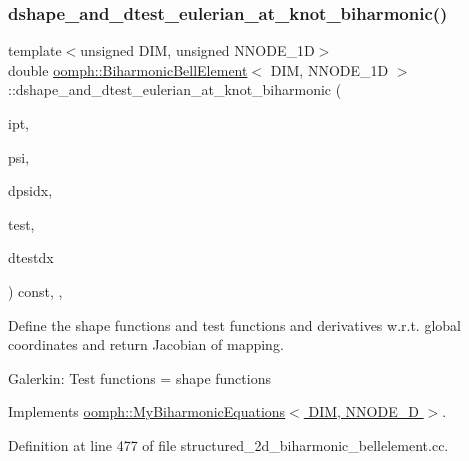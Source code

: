 \subsubsection{\texorpdfstring{dshape\+\_\+and\+\_\+dtest\+\_\+eulerian\+\_\+at\+\_\+knot\+\_\+biharmonic()}{dshape\_and\_dtest\_eulerian\_at\_knot\_biharmonic()}}
{\footnotesize\ttfamily template$<$unsigned D\+IM, unsigned N\+N\+O\+D\+E\+\_\+1D$>$ \\
double \hyperlink{classoomph_1_1BiharmonicBellElement}{oomph\+::\+Biharmonic\+Bell\+Element}$<$ D\+IM, N\+N\+O\+D\+E\+\_\+1D $>$\+::dshape\+\_\+and\+\_\+dtest\+\_\+eulerian\+\_\+at\+\_\+knot\+\_\+biharmonic (\begin{DoxyParamCaption}\item[{const unsigned \&}]{ipt,  }\item[{Shape \&}]{psi,  }\item[{D\+Shape \&}]{dpsidx,  }\item[{Shape \&}]{test,  }\item[{D\+Shape \&}]{dtestdx }\end{DoxyParamCaption}) const\hspace{0.3cm}{\ttfamily [inline]}, {\ttfamily [protected]}, {\ttfamily [virtual]}}

Define the shape functions and test functions and derivatives w.\+r.\+t. global coordinates and return Jacobian of mapping.

Galerkin\+: Test functions = shape functions 

Implements \hyperlink{classoomph_1_1MyBiharmonicEquations_a08e45fddb2c25119e6ba826cd6cafdbf}{oomph\+::\+My\+Biharmonic\+Equations$<$ D\+I\+M, N\+N\+O\+D\+E\+\_\+D $>$}.



Definition at line 477 of file structured\+\_\+2d\+\_\+biharmonic\+\_\+bellelement.\+cc.

\mbox{\label{classoomph_1_1BiharmonicBellElement_ab4fc981e180b12acd2a9865efb42459b}} 
